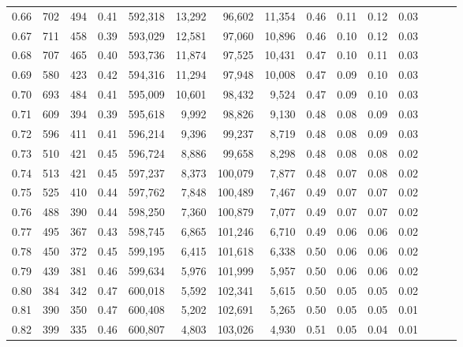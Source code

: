 \begin{tabular}{rrrrrrrrrrrrrrr}
0.66 &     702 &    494 &  0.41 &  592,318 &   13,292 &   96,602 &   11,354 &  0.46 &  0.11 &  0.12 &      0.03 \\
0.67 &     711 &    458 &  0.39 &  593,029 &   12,581 &   97,060 &   10,896 &  0.46 &  0.10 &  0.12 &      0.03 \\
0.68 &     707 &    465 &  0.40 &  593,736 &   11,874 &   97,525 &   10,431 &  0.47 &  0.10 &  0.11 &      0.03 \\
0.69 &     580 &    423 &  0.42 &  594,316 &   11,294 &   97,948 &   10,008 &  0.47 &  0.09 &  0.10 &      0.03 \\
0.70 &     693 &    484 &  0.41 &  595,009 &   10,601 &   98,432 &    9,524 &  0.47 &  0.09 &  0.10 &      0.03 \\
0.71 &     609 &    394 &  0.39 &  595,618 &    9,992 &   98,826 &    9,130 &  0.48 &  0.08 &  0.09 &      0.03 \\
0.72 &     596 &    411 &  0.41 &  596,214 &    9,396 &   99,237 &    8,719 &  0.48 &  0.08 &  0.09 &      0.03 \\
0.73 &     510 &    421 &  0.45 &  596,724 &    8,886 &   99,658 &    8,298 &  0.48 &  0.08 &  0.08 &      0.02 \\
0.74 &     513 &    421 &  0.45 &  597,237 &    8,373 &  100,079 &    7,877 &  0.48 &  0.07 &  0.08 &      0.02 \\
0.75 &     525 &    410 &  0.44 &  597,762 &    7,848 &  100,489 &    7,467 &  0.49 &  0.07 &  0.07 &      0.02 \\
0.76 &     488 &    390 &  0.44 &  598,250 &    7,360 &  100,879 &    7,077 &  0.49 &  0.07 &  0.07 &      0.02 \\
0.77 &     495 &    367 &  0.43 &  598,745 &    6,865 &  101,246 &    6,710 &  0.49 &  0.06 &  0.06 &      0.02 \\
0.78 &     450 &    372 &  0.45 &  599,195 &    6,415 &  101,618 &    6,338 &  0.50 &  0.06 &  0.06 &      0.02 \\
0.79 &     439 &    381 &  0.46 &  599,634 &    5,976 &  101,999 &    5,957 &  0.50 &  0.06 &  0.06 &      0.02 \\
0.80 &     384 &    342 &  0.47 &  600,018 &    5,592 &  102,341 &    5,615 &  0.50 &  0.05 &  0.05 &      0.02 \\
0.81 &     390 &    350 &  0.47 &  600,408 &    5,202 &  102,691 &    5,265 &  0.50 &  0.05 &  0.05 &      0.01 \\
0.82 &     399 &    335 &  0.46 &  600,807 &    4,803 &  103,026 &    4,930 &  0.51 &  0.05 &  0.04 &      0.01 \\

\end{tabular}

